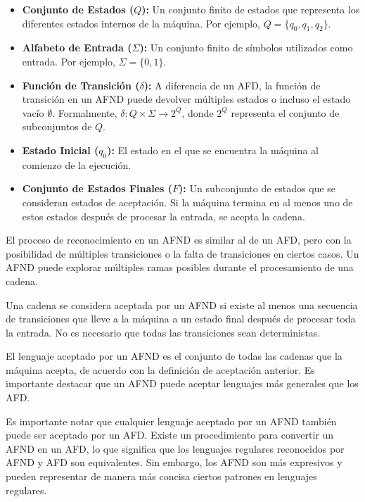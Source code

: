 \documentclass[11pt]{article} %
\begin{document}
\begin{itemize}
	\item \textbf{Conjunto de Estados ($Q$):} Un conjunto finito de estados que representa los diferentes estados internos de la máquina. Por ejemplo, $Q = \{q_0, q_1, q_2\}$.
	
	\item \textbf{Alfabeto de Entrada ($\Sigma$):} Un conjunto finito de símbolos utilizados como entrada. Por ejemplo, $\Sigma = \{0, 1\}$.
	
	\item \textbf{Función de Transición ($\delta$):} A diferencia de un AFD, la función de transición en un AFND puede devolver múltiples estados o incluso el estado vacío $\emptyset$. Formalmente, $\delta: Q \times \Sigma \rightarrow 2^Q$, donde $2^Q$ representa el conjunto de subconjuntos de $Q$.
	
	\item \textbf{Estado Inicial ($q_0$):} El estado en el que se encuentra la máquina al comienzo de la ejecución.
	
	\item \textbf{Conjunto de Estados Finales ($F$):} Un subconjunto de estados que se consideran estados de aceptación. Si la máquina termina en al menos uno de estos estados después de procesar la entrada, se acepta la cadena.
\end{itemize}


El proceso de reconocimiento en un AFND es similar al de un AFD, pero con la posibilidad de múltiples transiciones o la falta de transiciones en ciertos casos. Un AFND puede explorar múltiples ramas posibles durante el procesamiento de una cadena.


Una cadena se considera aceptada por un AFND si existe al menos una secuencia de transiciones que lleve a la máquina a un estado final después de procesar toda la entrada. No es necesario que todas las transiciones sean deterministas.


El lenguaje aceptado por un AFND es el conjunto de todas las cadenas que la máquina acepta, de acuerdo con la definición de aceptación anterior. Es importante destacar que un AFND puede aceptar lenguajes más generales que los AFD.


Es importante notar que cualquier lenguaje aceptado por un AFND también puede ser aceptado por un AFD. Existe un procedimiento para convertir un AFND en un AFD, lo que significa que los lenguajes regulares reconocidos por AFND y AFD son equivalentes. Sin embargo, los AFND son más expresivos y pueden representar de manera más concisa ciertos patrones en lenguajes regulares.
\end{document}
